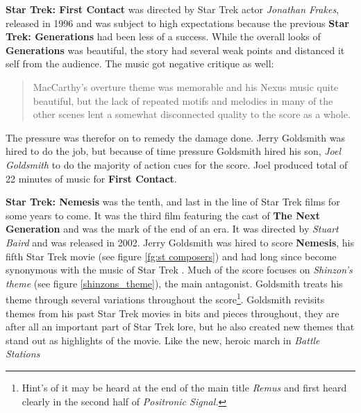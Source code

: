 \textbf{Star Trek: First Contact} was directed by Star Trek actor \textit{Jonathan Frakes}, released in 1996 and was subject to high expectations because the previous \textbf{Star Trek: Generations} had been less of a success. While the overall looks of \textbf{Generations} was beautiful, the story had several weak points and distanced it self from the audience. The music got negative critique as well: \blockquote[{\cite[152]{bond_music_1998}}]
{MacCarthy's overture theme was memorable and his Nexus music quite beautiful, but the lack of repeated motifs and melodies in many of the other scenes lent a somewhat disconnected quality to the score as a whole.} 
The pressure was therefor on to remedy the damage done. Jerry Goldsmith was hired to do the job, but because of time pressure Goldsmith hired his son, \textit{Joel Goldsmith} to do the majority of action cues for the score. Joel produced total of 22 minutes of music for \textbf{First Contact}. 


\textbf{Star Trek: Nemesis} was the tenth, and last in the line of Star Trek films for some years to come. It was the third film featuring the cast of \textbf{The Next Generation} and was the mark of the end of an era. It was directed by \textit{Stuart Baird} and was released in 2002. Jerry Goldsmith was hired to score \textbf{Nemesis}, his fifth Star Trek movie (see figure \ref{fg:st composers}) and had long since become synonymous with the music of Star Trek \parencite{bond_2013}. Much of the score focuses on \textit{Shinzon's theme} (see figure \ref{shinzons_theme}), the main antagonist. Goldsmith treats his theme through several variations throughout the score\footnote{Hint's of it may be heard at the end of the main title \textit{Remus} and first heard clearly in the second half of \textit{Positronic Signal.}}. Goldsmith revisits themes from his past Star Trek movies in bits and pieces throughout, they are after all an important part of Star Trek lore, but he also created new themes that stand out as highlights of the movie. Like the new, heroic march in \textit{Battle Stations} 

